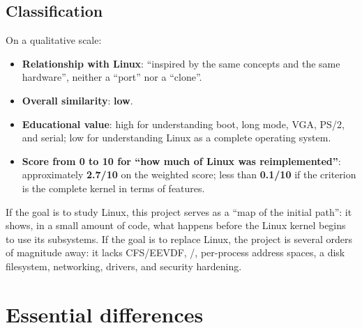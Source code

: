 \subsection{Classification}

On a qualitative scale:

\begin{itemize}
  \item \textbf{Relationship with Linux}: ``inspired by the same
        concepts and the same hardware'', neither a ``port'' nor a ``clone''.
  \item \textbf{Overall similarity}: \textbf{low}.
  \item \textbf{Educational value}: high for understanding boot, long mode,
        VGA, PS/2, and serial; low for understanding Linux as a complete
        operating system.
  \item \textbf{Score from 0 to 10 for ``how much of Linux was reimplemented''}:
        approximately \textbf{2.7/10} on the weighted score; less than
        \textbf{0.1/10} if the criterion is the complete kernel in
        terms of features.
\end{itemize}

\begin{nota}
If the goal is to study Linux, this project serves as a ``map of the initial
path'': it shows, in a small amount of code, what happens before the Linux
kernel begins to use its subsystems. If the goal is to replace Linux, the
project is several orders of magnitude away: it lacks CFS/EEVDF,
/, per-process address spaces, a disk filesystem,
networking, drivers, and security hardening.
\end{nota}

\section{Essential differences}


